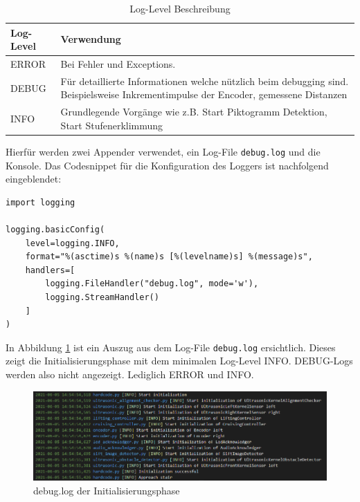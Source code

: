 \begin{center}
\begin{table}[H]
\begin{tabularx}{\textwidth}{|X|X|}
\hline
\textbf {Log-Level} & \textbf{Verwendung} \\
\hline
ERROR & Bei Fehler und Exceptions. \\
\hline
DEBUG & Für detaillierte Informationen welche nützlich beim debugging sind. Beispielsweise Inkrementimpulse der Encoder, gemessene Distanzen \\
\hline
INFO & Grundlegende Vorgänge wie z.B. Start Piktogramm Detektion, Start Stufenerklimmung \\
\hline
\end{tabularx}
\caption[Log-Level Beschreibung]{Log-Level Beschreibung}
\label{tab:log-level-description}
\end{table}
\end{center}
Hierfür werden zwei Appender verwendet, ein Log-File \texttt{debug.log} und die Konsole. Das Codesnippet für die Konfiguration des Loggers ist nachfolgend eingeblendet:

\begin{verbatim}
import logging

logging.basicConfig(
    level=logging.INFO,
    format="%(asctime)s %(name)s [%(levelname)s] %(message)s",
    handlers=[
        logging.FileHandler("debug.log", mode='w'),
        logging.StreamHandler()
    ]
)
\end{verbatim}

In Abbildung \ref{fig:log-example} ist ein Auszug aus dem Log-File \texttt{debug.log} ersichtlich. Dieses zeigt die Initialisierungsphase mit dem minimalen Log-Level INFO. DEBUG-Logs werden also nicht angezeigt. Lediglich ERROR und INFO.

\begin{figure}[H]
  \includegraphics[width=1\textwidth]{img/softwarearchitektur/log-example.PNG}
  \centering
  \caption{debug.log der Initialisierungsphase}
  \label{fig:log-example}
\end{figure}

